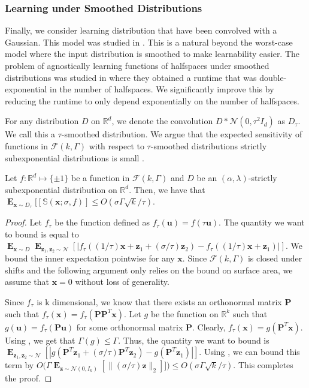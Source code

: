 \documentclass{theoretics}
\newcommand\twonorm[1]{\|#1\|_2}
\renewcommand\vec[1]{\mathbf{#1}}
\DeclareMathOperator*{\E}{\mathbf{E}}
\newcommand{\R}{\mathbb{R}}
\newcommand{\1}{\Ind}
\newcommand{\x}{\vec x}
\newcommand{\vu}{\vec u}
\newcommand{\z}{\vec z}
\newcommand{\F}{\mathcal{F}}
\newcommand{\Gauss}{\mathcal{N}}
\begin{document}
\subsubsection{Learning under Smoothed Distributions}
Finally, we consider learning distribution that have been convolved with a Gaussian. This model was studied in \cite{Kane2013LearningHalfspacesLogConcave}. This is a natural beyond the worst-case model where the input distribution is smoothed to make learnability easier. The problem of agnostically learning functions of halfspaces under smoothed distributions was studied in \cite{Kane2013LearningHalfspacesLogConcave} where they obtained a runtime that was double-exponential in the number of halfspaces. We significantly improve this by reducing the runtime to only depend exponentially on the number of halfspaces.

For any distribution $D$ on $\R^{d}$, we denote the convolution $D\ast \Gauss(0,\tau^2 I_d)$ as $D_{\tau}$. We call this a $\tau$-smoothed distribution. We argue that the expected sensitivity of functions in $\F(k,\Gamma)$ with respect to $\tau$-smoothed distributions strictly subexponential distributions is small .
\begin{lemma}
\label{lem:sens_gaussian}
Let $f:\R^{d}\mapsto \{\pm 1\}$ be a function in $\F(k,\Gamma)$ and $D$ be an $(\alpha,\lambda)$-strictly subexponential distribution on $\R^{d}$.  Then, we have that $\E_{\x\sim D_{\tau}}[[\mathbb S(\x;\sigma, f)]\leq O(\sigma \Gamma\sqrt{k}/\tau)$.
\end{lemma}
\begin{proof}
Let $f_{\tau}$ be the function defined as $f_{\tau}(\vu)=f(\tau\vu)$.
The quantity we want to bound is equal to $\E_{\x\sim D}\E_{\z_1,\z_2\sim \Gauss}\left[|f_{\tau}((1/\tau)\x+\z_1+(\sigma/\tau)\z_2)-f_{\tau}((1/\tau)\x+\z_1)|\right]$. We bound the inner expectation pointwise for any $\x$. Since $\F(k,\Gamma)$ is closed under shifts and the following argument only relies on the bound on surface area, we assume that $\x=0$ without loss of generality. 

Since $f_{\tau}$ is k dimensional, we know that there exists an orthonormal matrix $\vec P$ such that $f_{\tau}(\x)=f_{\tau}(\vec P\vec P^T \x)$. Let $g$ be the function on $\R^k$ such that $g(\vu)=f_{\tau}(\vec P \vu)$ for some orthonormal matrix $\vec P$. Clearly, $f_{\tau}(\x)=g(\vec P^T \x)$.  Using , we get that $\Gamma(g)\leq \Gamma$.  Thus, the quantity we want to bound is $\E_{\z_1,\z_2\sim \Gauss}[ |g(\vec P^T\z_1+(\sigma/\tau)\vec P^T\z_2)-g(\vec P^T\z_1)|]$. Using , we can bound this term by $O\bigl(\Gamma \E_{\z \sim \Gauss(0,I_{k})}[\twonorm{(\sigma/\tau)\z}]]\bigr)\leq O(\sigma \Gamma\sqrt{k}/\tau)$. This completes the proof.
\end{proof}
\end{document}
